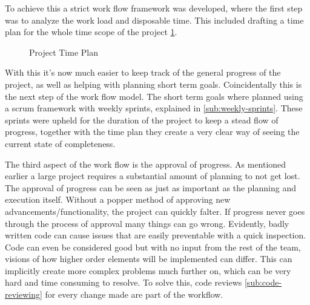     To achieve this a strict work flow framework was developed, where the first step was to analyze the work load and disposable time. This included drafting a time plan for the whole time scope of the project \ref{fig:time-plan}. 

    \begin{figure}[H]
        \centering
        \caption{Project Time Plan}
        \label{fig:time-plan}
    \end{figure}

    With this it's now much easier to keep track of the general progress of the project, as well as helping with planning short term goals. Coincidentally this is the next step of the work flow model. The short term goals where planned using a scrum framework with weekly sprints, explained in \ref{sub:weekly-sprints}. These sprints were upheld for the duration of the project to keep a stead flow of progress, together with the time plan they create a very clear way of seeing the current state of completeness. 

    The third aspect of the work flow is the approval of progress. As mentioned earlier a large project requires a substantial amount of planning to not get lost. The approval of progress can be seen as just as important as the planning and execution itself. Without a popper method of approving new advancements/functionality, the project can quickly falter. If progress never goes through the process of approval many things can go wrong. Evidently, badly written code can cause issues that are easily preventable with a quick inspection. Code can even be considered good but with no input from the rest of the team, visions of how higher order elements will be implemented can differ. This can implicitly create  more complex problems much further on, which can be very hard and time consuming to resolve. To solve this, code reviews \ref{sub:code-reviewing} for every change made are part of the workflow.  

